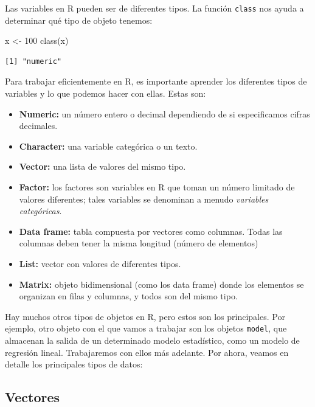 \documentclass[
  letterpaper,
  DIV=11,
  numbers=noendperiod]{scrreprt}
\newenvironment{Shaded}{\begin{snugshade}}{\end{snugshade}}
\newcommand{\DecValTok}[1]{\textcolor[rgb]{0.68,0.00,0.00}{#1}}
\newcommand{\FunctionTok}[1]{\textcolor[rgb]{0.28,0.35,0.67}{#1}}
\newcommand{\NormalTok}[1]{\textcolor[rgb]{0.00,0.23,0.31}{#1}}
\newcommand{\OtherTok}[1]{\textcolor[rgb]{0.00,0.23,0.31}{#1}}
\begin{document}
Las variables en R pueden ser de diferentes tipos. La función
\texttt{class} nos ayuda a determinar qué tipo de objeto tenemos:

\begin{Shaded}
\begin{Highlighting}[]
\NormalTok{x }\OtherTok{\textless{}{-}} \DecValTok{100}
\FunctionTok{class}\NormalTok{(x)}
\end{Highlighting}
\end{Shaded}

\begin{verbatim}
[1] "numeric"
\end{verbatim}

Para trabajar eficientemente en R, es importante aprender los diferentes
tipos de variables y lo que podemos hacer con ellas. Estas son:

\begin{itemize}
\item
  \textbf{Numeric:} un número entero o decimal dependiendo de si
  especificamos cifras decimales.
\item
  \textbf{Character:} una variable categórica o un texto.
\item
  \textbf{Vector:} una lista de valores del mismo tipo.
\item
  \textbf{Factor:} los factores son variables en R que toman un número
  limitado de valores diferentes; tales variables se denominan a menudo
  \emph{variables categóricas}.
\item
  \textbf{Data frame:} tabla compuesta por vectores como columnas. Todas
  las columnas deben tener la misma longitud (número de elementos)
\item
  \textbf{List:} vector con valores de diferentes tipos.
\item
  \textbf{Matrix:} objeto bidimensional (como los data frame) donde los
  elementos se organizan en filas y columnas, y todos son del mismo
  tipo.
\end{itemize}

Hay muchos otros tipos de objetos en R, pero estos son los principales.
Por ejemplo, otro objeto con el que vamos a trabajar son los objetos
\texttt{model}, que almacenan la salida de un determinado modelo
estadístico, como un modelo de regresión lineal. Trabajaremos con ellos
más adelante. Por ahora, veamos en detalle los principales tipos de
datos:

\hypertarget{vectores}{%
\subsection{Vectores}\label{vectores}}
\end{document}
